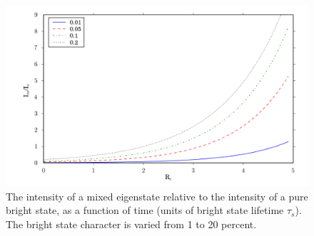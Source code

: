 \documentclass[12pt]{article}
\begin{document}
\begin{figure}
  \caption{The intensity of a mixed eigenstate relative to the
    intensity of a pure bright state, as a function of time (units of
    bright state lifetime $\tau_s$).  The bright state character is
    varied from 1 to 20 percent.}
  \label{fig:discr}
  \includegraphics[width=6.5in]{longlife-discrimination.png}
\end{figure}

\end{document}
